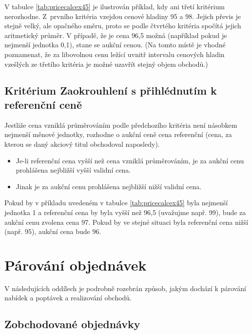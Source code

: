 \documentclass[thesis=M,czech]{FITthesis}[2012/06/26]
\begin{document}
V tabulce \ref{tab:pricecalcex45} je ilustrován příklad, kdy ani třetí kritérium nerozhodne. Z~prvního kritéria vzejdou cenové hladiny 
95 a 98. Jejich převis je stejně velký, ale opačného směru, proto se podle čtvrtého kritéria spočítá jejich aritmetický průměr. 
V případě, že je cena 96,5 možná (například pokud je nejmenší jednotka 0,1), stane se aukční cenou. (Na tomto místě je vhodné 
poznamenat, že za libovolnou cenu ležící uvnitř intervalu cenových hladin vzešlých ze třetího kritéria je možné uzavřít stejný objem
obchodů.)


\subsection{Kritérium Zaokrouhlení s přihlédnutím k referenční ceně}

Jestliže cena vzniklá průměrováním podle předchozího kritéria není násobkem nejmenší měnové jednotky, rozhodne o aukční ceně
cena referenční (cena, za kterou se daný akciový titul obchodoval naposledy).

\begin{itemize}
	\item Je-li referenční cena vyšší než cena vzniklá průměrováním, je za aukční cenu prohlášena nejbližší vyšší validní cena.
	\item Jinak je za aukční cenu prohlášena nejbližší nižší validní cena.
\end{itemize}

Pokud by v příkladu uvedeném v tabulce \ref {tab:pricecalcex45} byla nejmenší jednotka 1 a referenční cena by byla vyšší než 96,5
(uvažujme např. 99), bude za aukční cenu zvolena cena 97. Pokud by ve stejné situaci byla referenční cena nižší (např. 95), 
aukční cena bude 96.


\section{Párování objednávek}
\label{sec:strikerpair}

V následujících oddílech je podrobně rozebrán způsob, jakým dochází k párování nabídek a poptávek a realizování obchodů.


\subsection{Zobchodované objednávky}
\end{document}
